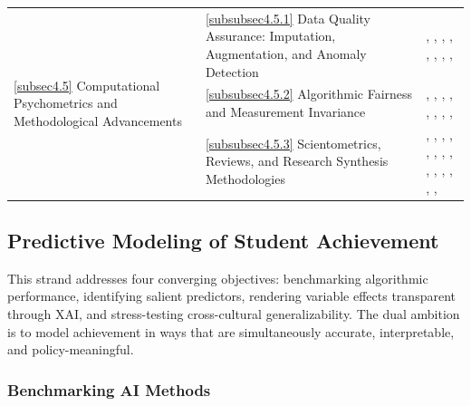\documentclass{ieeeaccess}
\begin{document}
\begin{table}[!t]
\begin{tabular}{p{2.7cm}p{6.7cm}p{6.8cm}}
\multirow{3}{=}{\parbox[t]{2.8cm}{\ref{subsec4.5} Computational Psychometrics and Methodological Advancements}}
& \ref{subsubsec4.5.1} Data Quality Assurance: Imputation, Augmentation, and Anomaly Detection
& \cite{lee-lee-ExtendedDataset2025}, \cite{zhou-jiao2023}, \cite{huang-keller2025}, \cite{pejic-etal2022}, \cite{braun-etal2025}, \cite{cortes-etal2025}, \cite{kasapEffectWeightVariable2025}, \cite{hoInstructionalPracticesStudents2023}, \cite{celikComparativeAnalysisGlobal2026}\\
\addlinespace

& \ref{subsubsec4.5.2} Algorithmic Fairness and Measurement Invariance
& \cite{robitzsch-ludtke2022}, \cite{andersen-etal2025}, \cite{li-etal2025}, \cite{park-etal2025}, \cite{mirazchiyski-gershteyn2024}, \cite{chenDiscriminationContextualFeatures2021}, \cite{bernardoPredictorsCognitiveSkills2026}, \cite{ustunStudentSchoollevelFactors2022}, \cite{lazaridesDisentanglingTeacherLesson}\\
\addlinespace

& \ref{subsubsec4.5.3} Scientometrics, Reviews, and Research Synthesis Methodologies
& \cite{hernandez-torrano-courtney2021}, \cite{murchan-siddiq2021}, \cite{anghel-etal2024}, \cite{huang-etal2025}, \cite{ang-etal2020}, \cite{jiao-etal2021}, \cite{maia-etal023}, \cite{rutkowski-etal2024}, \cite{stiff-etal2023}, \cite{scherer-etal2024}, \cite{fink-etal2024}, \cite{enchikovaChangeSocioeconomicEducational2024}, \cite{teigSystematicReviewStudies2022}, \cite{InfluentialFactorsMathematical2023}, \cite{wuWhichTeachersAdopt2026}\\

\bottomrule
\end{tabular}
\end{table}

\subsection{Predictive Modeling of Student Achievement}\label{subsec4.1}

This strand addresses four converging objectives: benchmarking algorithmic performance, identifying salient predictors, rendering variable effects transparent through XAI, and stress-testing cross-cultural generalizability. The dual ambition is to model achievement in ways that are simultaneously accurate, interpretable, and policy-meaningful.

\subsubsection{Benchmarking AI Methods}\label{subsubsec4.1.1}
\end{document}
